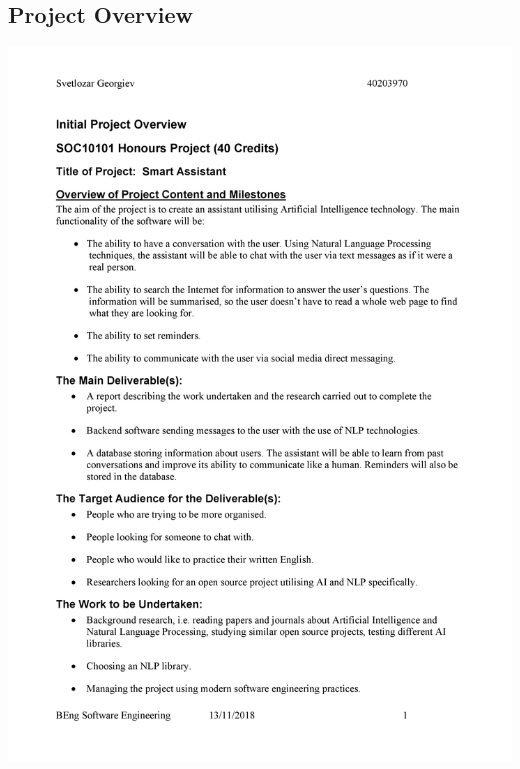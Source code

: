 \documentclass[12pt,a4paper]{article}
\begin{document}
\newpage
\begin{appendices}
\section{Project Overview}\label{app:ipo}
\includegraphics[width=\textwidth,height=\textheight,keepaspectratio]{IPO-0.png} %
\newpage

\end{appendices}
\end{document}

